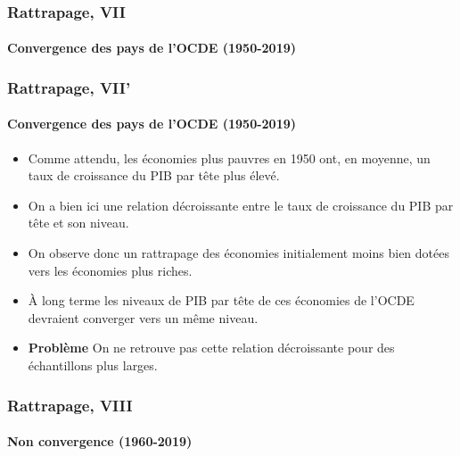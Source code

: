 \documentclass[10pt,notheorems]{beamer}
\theoremstyle{plain}
\theoremstyle{definition} %
\begin{document}
\begin{frame}
  \frametitle{Rattrapage, VII}
  \framesubtitle{Convergence des pays de l'OCDE (1950-2019)}

  \begin{Center}
    
  \end{Center}

\end{frame}


\begin{frame}
  \frametitle{Rattrapage, VII'}
  \framesubtitle{Convergence des pays de l'OCDE (1950-2019)}

  \begin{itemize}

  \item Comme attendu, les économies plus pauvres en 1950 ont, en moyenne, un taux de croissance du PIB par tête plus élevé.\newline

  \item On a bien ici une relation décroissante entre le taux de croissance du PIB par tête et son niveau.\newline

  \item On observe donc un rattrapage des économies initialement moins bien dotées vers les économies plus riches.\newline

  \item À long terme les niveaux de PIB par tête de ces économies de l'OCDE devraient converger vers un même niveau.\newline

    \medskip

  \item \textbf{Problème} On ne retrouve pas cette relation décroissante pour des échantillons plus larges.

  \end{itemize}

\end{frame}


\begin{frame}
  \frametitle{Rattrapage, VIII}
  \framesubtitle{Non convergence (1960-2019)}

  \begin{Center}
    
  \end{Center}

\end{frame}
\end{document}
